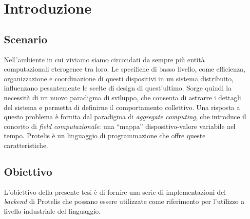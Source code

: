 \section{Introduzione}
\subsection{Scenario}

Nell'ambiente in cui viviamo siamo circondati da sempre più entità
computazionali eterogenee tra loro. Le specifiche di basso livello, come
efficienza, organizzazione e coordinazione di questi dispositivi in un sistema
distribuito, influenzano pesantemente le scelte di design di quest'ultimo. Sorge
quindi la necessità di un nuovo paradigma di sviluppo, che consenta di astrarre
i dettagli del sistema e permetta di definirne il comportamento collettivo. Una
risposta a questo problema è fornita dal paradigma di \textit{aggregate
  computing}, che introduce il concetto di \textit{field computazionale}: una
``mappa'' dispositivo-valore variabile nel tempo. Protelis è un linguaggio di
programmazione che offre queste caratteristiche.


\subsection{Obiettivo}

L'obiettivo della presente tesi è di fornire una serie di implementazioni del
\textit{backend} di Protelis che possano essere utilizzate come riferimento per
l'utilizzo a livello industriale del linguaggio.

